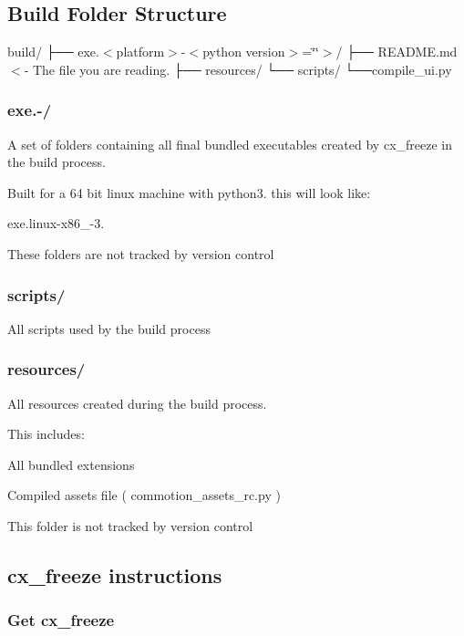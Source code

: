 \subsection*{Build Folder Structure}

build/ ├── exe.$<$platform$>$-\/$<$python version$>$=\char`\"{}\char`\"{}$>$/ ├── R\-E\-A\-D\-M\-E.\-md $<$-\/ The file you are reading. ├── resources/ └── scripts/ └──compile\-\_\-ui.\-py

\subsubsection*{exe.-\//}

A set of folders containing all final bundled executables created by cx\-\_\-freeze in the build process.

Built for a 64 bit linux machine with python3. this will look like\-:

{\ttfamily exe.\-linux-\/x86\-\_-\/3.}

These folders are not tracked by version control

\subsubsection*{scripts/}

All scripts used by the build process

\subsubsection*{resources/}

All resources created during the build process.

This includes\-:
\begin{DoxyItemize}
\item All bundled extensions
\item Compiled assets file ( commotion\-\_\-assets\-\_\-rc.\-py )
\end{DoxyItemize}

This folder is not tracked by version control

\subsection*{cx\-\_\-freeze instructions}

\subsubsection*{Get cx\-\_\-freeze}

